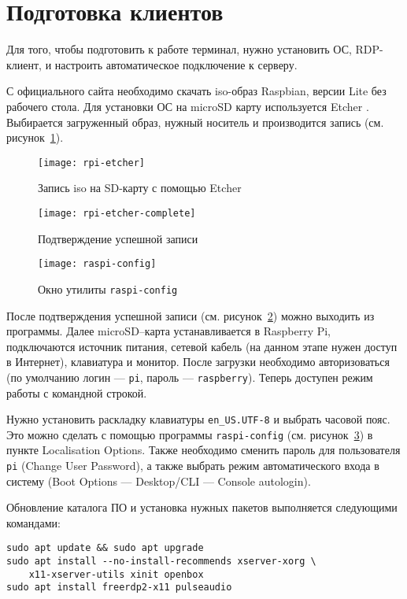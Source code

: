 \section{Подготовка клиентов}

Для того, чтобы подготовить к работе терминал, нужно установить ОС, RDP-клиент, и 
настроить автоматическое подключение к серверу.

С официального сайта \cite{ref:raspbian} необходимо скачать iso-образ Raspbian, версии
Lite без рабочего стола. Для установки ОС на microSD карту используется Etcher
\cite{ref:etcher}. Выбирается загруженный образ, нужный носитель и производится запись
(см. рисунок~\ref{pic:rpi-etcher}).

\begin{figure}[h]
    \center
    \texttt{[image: rpi-etcher]}
    \caption{Запись iso на SD-карту с помощью Etcher}
    \label{pic:rpi-etcher}
\end{figure}

\begin{figure}[h]
    \center
    \texttt{[image: rpi-etcher-complete]}
    \caption{Подтверждение успешной записи}
    \label{pic:rpi-etcher-complete}
\end{figure}

\begin{figure}[h]
    \center
    \texttt{[image: raspi-config]}
    \caption{Окно утилиты \texttt{raspi-config}}
    \label{pic:raspi-config}
\end{figure}

После подтверждения успешной записи (см. рисунок~\ref{pic:rpi-etcher-complete}) можно
выходить из программы. Далее microSD–карта устанавливается в Raspberry Pi, подключаются
источник питания, сетевой кабель (на данном этапе нужен доступ в Интернет), клавиатура 
и монитор. После загрузки необходимо авторизоваться (по умолчанию логин — 
\texttt{pi}, пароль — \texttt{raspberry}). Теперь доступен режим работы с командной
строкой.

Нужно установить раскладку клавиатуры \texttt{en\_US.UTF-8} и выбрать часовой пояс. Это
можно сделать с помощью программы \texttt{raspi-config} (см.
рисунок~\ref{pic:raspi-config}) в пункте Localisation Options.  Также необходимо сменить
пароль для пользователя \texttt{pi} (Change User Password), а также выбрать режим
автоматического входа в систему (Boot Options — Desktop/CLI — Console autologin).

Обновление каталога ПО и установка нужных пакетов выполняется следующими командами:
\begin{verbatim}
sudo apt update && sudo apt upgrade
sudo apt install --no-install-recommends xserver-xorg \
    x11-xserver-utils xinit openbox
sudo apt install freerdp2-x11 pulseaudio
\end{verbatim}

